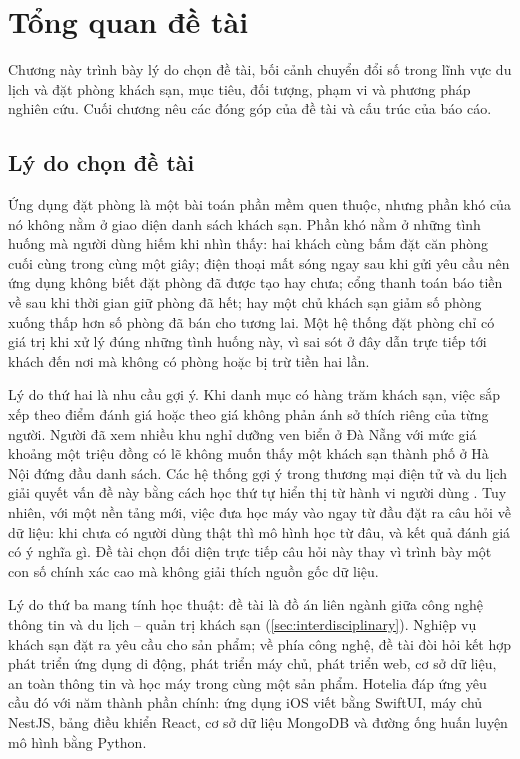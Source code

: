 \chapter{Tổng quan đề tài}\label{chap:overview}

Chương này trình bày lý do chọn đề tài, bối cảnh chuyển đổi số trong lĩnh vực du lịch và đặt phòng khách sạn, mục tiêu, đối tượng, phạm vi và phương pháp nghiên cứu. Cuối chương nêu các đóng góp của đề tài và cấu trúc của báo cáo.

\section{Lý do chọn đề tài}\label{sec:reason}

Ứng dụng đặt phòng là một bài toán phần mềm quen thuộc, nhưng phần khó của nó không nằm ở giao diện danh sách khách sạn. Phần khó nằm ở những tình huống mà người dùng hiếm khi nhìn thấy: hai khách cùng bấm đặt căn phòng cuối cùng trong cùng một giây; điện thoại mất sóng ngay sau khi gửi yêu cầu nên ứng dụng không biết đặt phòng đã được tạo hay chưa; cổng thanh toán báo tiền về sau khi thời gian giữ phòng đã hết; hay một chủ khách sạn giảm số phòng xuống thấp hơn số phòng đã bán cho tương lai. Một hệ thống đặt phòng chỉ có giá trị khi xử lý đúng những tình huống này, vì sai sót ở đây dẫn trực tiếp tới khách đến nơi mà không có phòng hoặc bị trừ tiền hai lần.

Lý do thứ hai là nhu cầu gợi ý. Khi danh mục có hàng trăm khách sạn, việc sắp xếp theo điểm đánh giá hoặc theo giá không phản ánh sở thích riêng của từng người. Người đã xem nhiều khu nghỉ dưỡng ven biển ở Đà Nẵng với mức giá khoảng một triệu đồng có lẽ không muốn thấy một khách sạn thành phố ở Hà Nội đứng đầu danh sách. Các hệ thống gợi ý trong thương mại điện tử và du lịch giải quyết vấn đề này bằng cách học thứ tự hiển thị từ hành vi người dùng \cite{ricci2022,adamczak2019}. Tuy nhiên, với một nền tảng mới, việc đưa học máy vào ngay từ đầu đặt ra câu hỏi về dữ liệu: khi chưa có người dùng thật thì mô hình học từ đâu, và kết quả đánh giá có ý nghĩa gì. Đề tài chọn đối diện trực tiếp câu hỏi này thay vì trình bày một con số chính xác cao mà không giải thích nguồn gốc dữ liệu.

Lý do thứ ba mang tính học thuật: đề tài là đồ án liên ngành giữa công nghệ thông tin và du lịch -- quản trị khách sạn (\cref{sec:interdisciplinary}). Nghiệp vụ khách sạn đặt ra yêu cầu cho sản phẩm; về phía công nghệ, đề tài đòi hỏi kết hợp phát triển ứng dụng di động, phát triển máy chủ, phát triển web, cơ sở dữ liệu, an toàn thông tin và học máy trong cùng một sản phẩm. Hotelia đáp ứng yêu cầu đó với năm thành phần chính: ứng dụng iOS viết bằng SwiftUI, máy chủ NestJS, bảng điều khiển React, cơ sở dữ liệu MongoDB và đường ống huấn luyện mô hình bằng Python.

